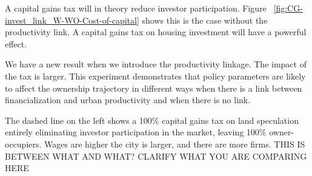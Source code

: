 A capital gains tax will in theory reduce investor participation. Figure ~\ref{fig:CG-invest_link_W-WO-Cost-of-capital} shows this is the case without the productivity link. A capital gains tax on housing investment will have a powerful effect.

We have a new result when we introduce the productivity linkage. 
The impact of the tax is larger. This experiment demonstrates that policy parameters are likely to affect the ownership trajectory in different ways when there is a link between financialization and urban productivity and when there is no link.

The dashed line on the left shows a 100\% capital gains tax on land speculation entirely eliminating investor participation in the market, leaving 100\%  owner-occupiers.  Wages are higher the city is larger, and there are more firms. {\color{red} THIS IS BETWEEN WHAT AND WHAT? CLARIFY WHAT YOU ARE COMPARING HERE}

\newpage
